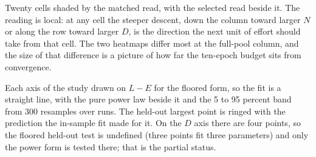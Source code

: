 Twenty cells shaded by the matched read, with the selected read beside it. The
reading is local: at any cell the steeper descent, down the column toward
larger $N$ or along the row toward larger $D$, is the direction the next unit of
effort should take from that cell. The two heatmaps differ most at the full-pool
column, and the size of that difference is a picture of how far the ten-epoch
budget sits from convergence.

Each axis of the study drawn on $L - E$ for the floored form, so the fit is a
straight line, with the pure power law beside it and the 5 to 95 percent band
from 300 resamples over runs. The held-out largest point is ringed with the
prediction the in-sample fit made for it. On the $D$ axis there are four points,
so the floored held-out test is undefined (three points fit three parameters)
and only the power form is tested there; that is the partial status.
